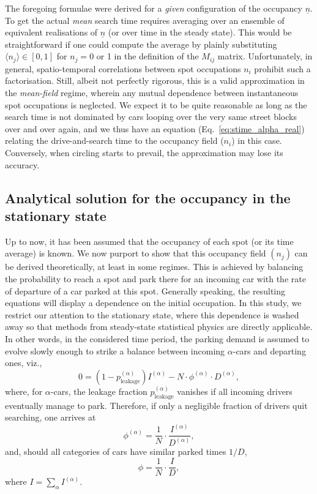 \documentclass[trsc,reprint]{informs3}
\newcommand{\ul}[1]{\underline{#1}}
\newcommand{\alp}{^{(\alpha)}}
\begin{document}
The foregoing formulae were derived for a \emph{given} configuration of the occupancy $\ul{n}$. To get the actual \emph{mean} search time requires averaging over an ensemble of equivalent realisations of $\ul{n}$  (or over time in the steady state). This would be
straightforward if one could compute the average by plainly substituting $\langle n_j \rangle \in [0,1]$ for $n_j =0$ or 1 in the definition of the $M_{ij}$ matrix. Unfortunately, in general, spatio-temporal correlations between spot occupations $n_i$ prohibit such a factorisation.
Still, albeit not perfectly rigorous, this is a valid approximation in the \emph{mean-field} regime, wherein any mutual dependence
between instantaneous spot occupations is neglected. We expect it to be quite reasonable as long
as the search time is not dominated by cars looping over the very same street blocks over and over again, and we thus have an equation (Eq.~\ref{eq:stime_alpha_real}) relating the drive-and-search time to the occupancy field ($n_i$) in this case. Conversely, when circling starts to prevail,
the approximation may lose its accuracy.

\subsection{Analytical solution for the occupancy in the stationary state}

Up to now, it has been assumed that the occupancy of each spot (or its time average) is known. We now purport to show that this occupancy field $(n_j)$ can be derived theoretically, at least in some regimes.
This is achieved by balancing the probability to reach a spot and park there for an incoming car with
the rate of departure of a car parked at this spot.
Generally speaking, the resulting equations will display a dependence on the initial occupation.
In this study, we restrict our attention to the stationary state, where this dependence is washed
away so that methods from steady-state statistical physics are directly applicable. In other words, in the considered time period, the parking demand is assumed to evolve slowly 
enough to strike a balance between incoming $\alpha$-cars and departing ones, viz.,
\begin{equation}
    0= (1-p\alp_{\mathrm{leakage}})I\alp - N \cdot \phi\alp \cdot D\alp,
\end{equation}
where, for $\alpha$-cars, the leakage fraction $p\alp_{\mathrm{leakage}}$ vanishes if all incoming drivers eventually manage to park. Therefore, if only a negligible fraction of drivers quit searching, one arrives at
\begin{equation}
    \phi\alp = \frac{1}{N} \cdot  \frac{ I\alp}{D\alp},
    \label{eq:conservation_alpha}
\end{equation}
and, should all categories of cars have similar parked times $1/D$,
\begin{equation}
      \phi = \frac{1}{N} \cdot  \frac{I}{D},
\label{eq:phi_conservation}
\end{equation}
where $I= \sum_{\alpha} I\alp $.
\end{document}
